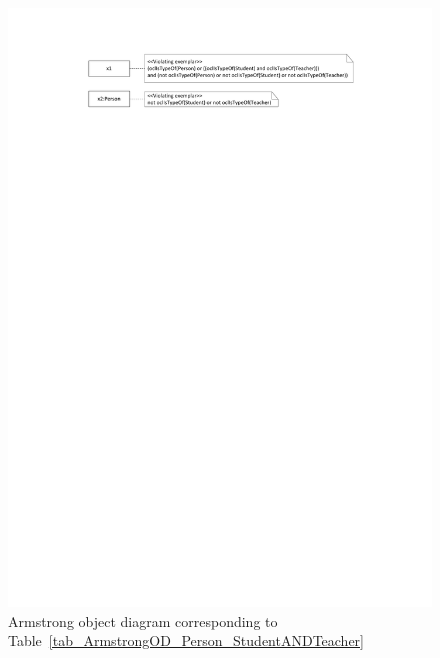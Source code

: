 \documentclass{amsart}
\begin{document}
    
        \begin{figure}
    \centering \includegraphics[trim = 30mm 245mm 30mm 20mm, clip, scale=0.9]{./ArmstrongOD_Person_StudentANDTeacher.pdf}
    \caption{Armstrong object diagram corresponding to Table~\ref{tab_ArmstrongOD_Person_StudentANDTeacher}}\label{fig_ArmstrongOD_Person_StudentANDTeacher}
    \end{figure} 
   
\end{document}
